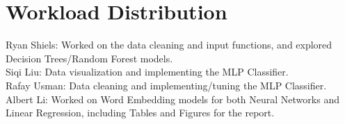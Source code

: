 \documentclass[journal]{IEEEtran}
\begin{document}
\section{Workload Distribution}

Ryan Shiels: Worked on the data cleaning and input functions, and explored Decision Trees/Random Forest models. \\
Siqi Liu: Data visualization and implementing the MLP Classifier. \\
Rafay Usman: Data cleaning and implementing/tuning the MLP Classifier. \\
Albert Li: Worked on Word Embedding models for both Neural Networks and Linear Regression, including Tables and Figures for the report.
\end{document}
